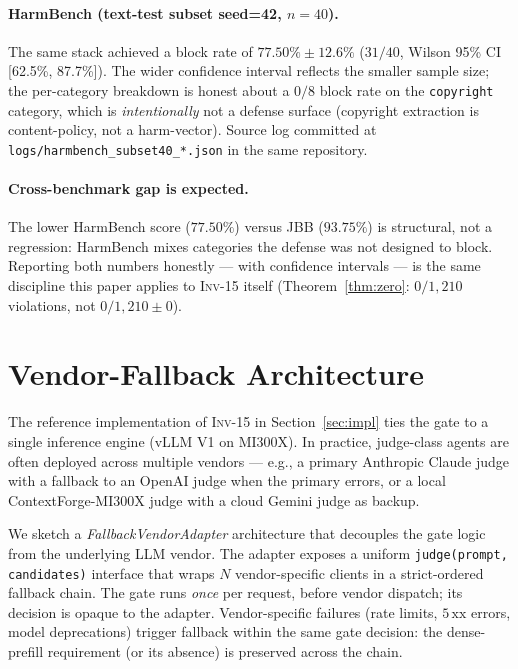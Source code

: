 \documentclass[10pt,twocolumn]{article}
\newcommand{\INV}[1]{\textsc{Inv-#1}}
\newcommand{\code}[1]{\texttt{\small #1}}
\begin{document}
\paragraph{HarmBench (text-test subset seed=42, $n{=}40$).}
The same stack achieved a block rate of
$77.50\% \pm 12.6\%$ ($31/40$, Wilson 95\% CI
[62.5\%, 87.7\%]). The wider confidence interval reflects the
smaller sample size; the per-category breakdown is honest about a
$0/8$ block rate on the \texttt{copyright} category, which is
\emph{intentionally} not a defense surface (copyright extraction is
content-policy, not a harm-vector). Source log committed at
\code{logs/harmbench\_subset40\_*.json} in the same repository.

\paragraph{Cross-benchmark gap is expected.} The lower HarmBench
score ($77.50\%$) versus JBB ($93.75\%$) is structural, not a
regression: HarmBench mixes categories the defense was not designed
to block. Reporting both numbers honestly --- with confidence
intervals --- is the same discipline this paper applies to \INV{15}
itself (Theorem~\ref{thm:zero}: $0/1{,}210$ violations, not
$0/1{,}210 \pm 0$).

\section{Vendor-Fallback Architecture}
\label{sec:fallback}

The reference implementation of \INV{15} in Section~\ref{sec:impl}
ties the gate to a single inference engine (vLLM V1 on MI300X). In
practice, judge-class agents are often deployed across multiple
vendors --- e.g., a primary Anthropic Claude judge with a fallback
to an OpenAI judge when the primary errors, or a local
ContextForge-MI300X judge with a cloud Gemini judge as backup.

We sketch a \emph{FallbackVendorAdapter} architecture that decouples
the gate logic from the underlying LLM vendor. The adapter exposes
a uniform \texttt{judge(prompt, candidates)} interface that wraps
$N$ vendor-specific clients in a strict-ordered fallback chain.
The gate runs \emph{once} per request, before vendor dispatch; its
decision is opaque to the adapter. Vendor-specific failures (rate
limits, $5\,\mathrm{xx}$ errors, model deprecations) trigger
fallback within the same gate decision: the dense-prefill
requirement (or its absence) is preserved across the chain.
\end{document}
